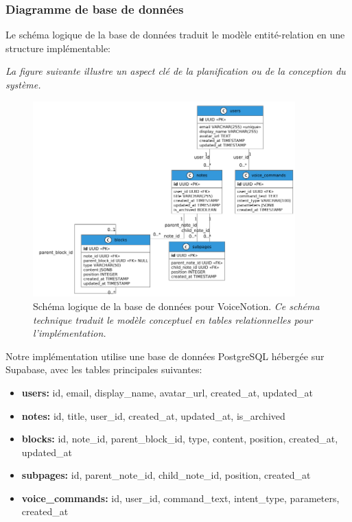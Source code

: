 \subsubsection{Diagramme de base de données}

Le schéma logique de la base de données traduit le modèle entité-relation en une structure implémentable:

\noindent
\textit{La figure suivante illustre un aspect clé de la planification ou de la conception du système.}
\begin{figure}[H]
    \centering
    \includegraphics[width=0.9\textwidth]{assets/docs/voicenotion_db_schema.png}
    \caption{Schéma logique de la base de données pour VoiceNotion. \newline\textit{Ce schéma technique traduit le modèle conceptuel en tables relationnelles pour l'implémentation.}}
    \label{fig:db_schema}
\end{figure}

Notre implémentation utilise une base de données PostgreSQL hébergée sur Supabase, avec les tables principales suivantes:

\begin{itemize}
    \item \textbf{users:} id, email, display\_name, avatar\_url, created\_at, updated\_at
    
    \item \textbf{notes:} id, title, user\_id, created\_at, updated\_at, is\_archived
    
    \item \textbf{blocks:} id, note\_id, parent\_block\_id, type, content, position, created\_at, updated\_at
    
    \item \textbf{subpages:} id, parent\_note\_id, child\_note\_id, position, created\_at
    
    \item \textbf{voice\_commands:} id, user\_id, command\_text, intent\_type, parameters, created\_at
\end{itemize}

